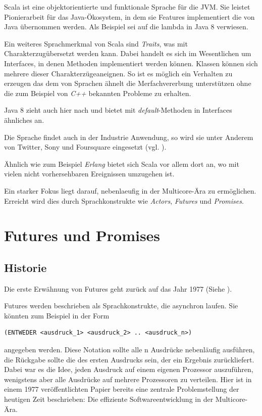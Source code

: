 \documentclass[11pt,a4paper,titlepage,ngerman]{scrartcl}
\begin{document}
Scala ist eine objektorientierte und funktionale Sprache für die JVM. Sie
leistet Pionierarbeit für das Java-Ökosystem, in dem sie Features implementiert
die von Java übernommen werden. Als Beispiel sei auf die \gls{lambda} in
Java 8 verwiesen.

Ein weiteres Sprachmerkmal von Scala sind \emph{Traits}, was mit 
\glqq Charakterzug\grqq übersetzt werden kann. Dabei handelt es sich im
Wesentlichen um Interfaces, in denen Methoden implementiert werden können.
Klassen können sich mehrere dieser \glqq Charakterzüge\grqq aneignen.
So ist es möglich ein Verhalten zu erzeugen das dem von Sprachen ähnelt die
Merfachvererbung unterstützen ohne die zum Beispiel von \emph{C++} bekannten
Probleme zu erhalten.

Java 8 zieht auch hier nach und bietet mit \emph{default}-Methoden in Interfaces
ähnliches an.

Die Sprache findet auch in der Industrie Anwendung, so wird sie unter Anderem von Twitter,
Sony und Foursquare eingesetzt (vgl. \cite{scalaInEnterprise}).

Ähnlich wie zum Beispiel \emph{Erlang} bietet sich Scala vor allem dort an,
wo mit vielen nicht vorhersehbaren Ereignissen umzugehen ist.

Ein starker Fokus liegt darauf, \gls{nebenlaeufig} in der Multicore-Ära
zu ermöglichen. Erreicht wird dies durch Sprachkonstrukte wie \emph{Actors},
\emph{Futures} und \emph{Promises}.


\section{Futures und Promises}

\subsection{Historie}

Die erste Erwähnung von Futures geht zurück auf das Jahr 1977 
(Siehe \cite{Baker:1977:IGC:872734.806932}).

Futures werden beschrieben als Sprachkonstrukte, die asynchron laufen. Sie 
könnten zum Beispiel in der Form 
\begin{lstlisting}
(ENTWEDER <ausdruck_1> <ausdruck_2> .. <ausdruck_n>)
\end{lstlisting}
angegeben werden. Diese Notation sollte alle n Ausdrücke nebenläufig ausführen, 
die Rückgabe sollte die des ersten Ausdrucks sein, der ein Ergebnis zurückliefert.
Dabei war es die Idee, jeden Ausdruck auf einem eigenen Prozessor auszuführen, 
wenigstens aber alle Ausdrücke auf mehrere Prozessoren zu verteilen. Hier ist in 
einem 1977 veröffentlichten Papier bereits eine zentrale Problemstellung der 
heutigen Zeit beschrieben: Die effiziente Softwareentwicklung in der Multicore-Ära.
\end{document}
